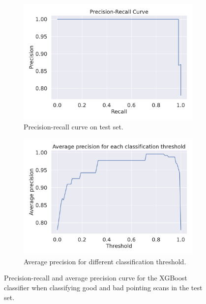 \begin{figure}[H]
    \centering
    \begin{subfigure}[t]{0.49\textwidth}
        \centering
        \includegraphics[width=1\textwidth]{Clf/precision_recall_curve_both.pdf}
        \caption{Precision-recall curve on test set.}
        \label{subfig:pr_curve}
    \end{subfigure}
    \begin{subfigure}[t]{0.49\textwidth}
       \centering
       \includegraphics[width=1\textwidth]{Clf/mAP_curve_both.pdf}
       \caption{Average precision for different classification threshold.}
       \label{subfig:map_curve}
    \end{subfigure}
     \caption{Precision-recall and average precision curve for the XGBoost classifier when classifying good and bad pointing scans in the test set.}
     \label{fig:pointing_scan_clf}
\end{figure}

